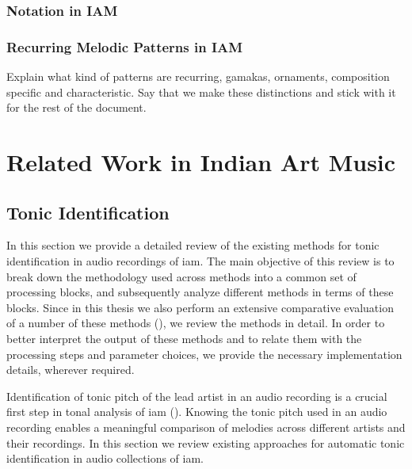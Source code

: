 \subsubsection{Notation in IAM}


\subsubsection{Recurring Melodic Patterns in IAM}

Explain what kind of patterns are recurring, gamakas, ornaments, composition specific and characteristic. Say that we make these distinctions and stick with it for the rest of the document.

 


\section{Related Work in Indian Art Music}
\label{sec:background_relevant_work_iam}


\subsection{Tonic Identification}
\label{sec:background_relevant_work_tonic_identification}

In this section we provide a detailed review of the existing methods for tonic identification in audio recordings of \gls{iam}. The main objective of this review is to break down the methodology used across methods into a common set of processing blocks, and subsequently analyze different methods in terms of these blocks. Since in this thesis we also perform an extensive comparative evaluation of a number of these methods (), we review the methods in detail. In order to better interpret the output of these methods and to relate them with the processing steps and parameter choices, we provide the necessary implementation details, wherever required.


Identification of tonic pitch of the lead artist in an audio recording is a crucial first step in tonal analysis of \gls{iam} (). Knowing the tonic pitch used in an audio recording enables a meaningful comparison of melodies across different artists and their recordings. In this section we review existing approaches for automatic tonic identification in audio collections of \gls{iam}. 

